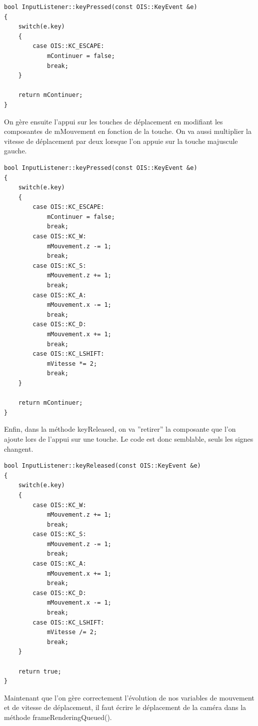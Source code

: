 \documentclass[10pt,a4paper]{report}
\begin{document}
\begin{lstlisting}[caption={Impl\'ementation de l'appuie sur ECHAP}]
bool InputListener::keyPressed(const OIS::KeyEvent &e)
{
    switch(e.key)
    {
        case OIS::KC_ESCAPE:
            mContinuer = false;
            break;
    }

    return mContinuer;
}
\end{lstlisting}

On g\`ere ensuite l'appui sur les touches de d\'eplacement en modifiant les composantes de mMouvement en fonction de la touche. On va aussi multiplier la vitesse de d\'eplacement par deux lorsque l'on appuie sur la touche majuscule gauche.

\begin{lstlisting}[caption={Impl\'ementation de l'appuie sur les touches de d\'eplacement}]
bool InputListener::keyPressed(const OIS::KeyEvent &e)
{
    switch(e.key)
    {
        case OIS::KC_ESCAPE:
            mContinuer = false;
            break;
        case OIS::KC_W:
            mMouvement.z -= 1;
            break;
        case OIS::KC_S:
            mMouvement.z += 1;
            break;
        case OIS::KC_A:
            mMouvement.x -= 1;
            break;
        case OIS::KC_D:
            mMouvement.x += 1;
            break;
        case OIS::KC_LSHIFT:
            mVitesse *= 2;
            break;
    }

    return mContinuer;
}
\end{lstlisting}

Enfin, dans la m\'ethode keyReleased, on va ''retirer'' la composante que l'on ajoute lors de l'appui sur une touche. Le code est donc semblable, seuls les signes changent.

\begin{lstlisting}[caption={}]
bool InputListener::keyReleased(const OIS::KeyEvent &e)
{
    switch(e.key)
    {
        case OIS::KC_W:
            mMouvement.z += 1;
            break;
        case OIS::KC_S:
            mMouvement.z -= 1;
            break;
        case OIS::KC_A:
            mMouvement.x += 1;
            break;
        case OIS::KC_D:
            mMouvement.x -= 1;
            break;
        case OIS::KC_LSHIFT:
            mVitesse /= 2;
            break;
    }

    return true;
}
\end{lstlisting}

Maintenant que l'on g\`ere correctement l'\'evolution de nos variables de mouvement et de vitesse de d\'eplacement, il faut \'ecrire le d\'eplacement de la cam\'era dans la m\'ethode frameRenderingQueued().
\end{document}
